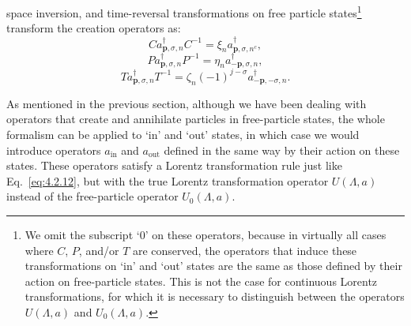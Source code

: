 space inversion, and time-reversal transformations on free particle states\footnote{We
omit the subscript `0' on these operators, because in virtually all cases where $C$,
$P$, and/or $T$ are conserved, the operators that induce these transformations on
`in' and `out' states are the same as those defined by their action on free-particle
states. This is not the case for continuous Lorentz transformations, for which it is
necessary to distinguish between the operators $U(\Lambda,a)$ and $U_0(\Lambda,a)$.}
transform the creation operators as:
\begin{equation}
  Ca^\dagger_{\mathbf p,\sigma,n}C^{-1}
  =\xi_n a^\dagger_{\mathbf p,\sigma,n^c},
  \tag{4.2.13}
  \label{eq:4.2.13}
\end{equation}
\begin{equation}
  Pa^\dagger_{\mathbf p,\sigma,n}P^{-1}
  =\eta_n a^\dagger_{-\mathbf p,\sigma,n},
  \tag{4.2.14}
  \label{eq:4.2.14}
\end{equation}
\begin{equation}
  Ta^\dagger_{\mathbf p,\sigma,n}T^{-1}
  =\zeta_n(-1)^{j-\sigma}a^\dagger_{-\mathbf p,-\sigma,n}.
  \tag{4.2.15}
  \label{eq:4.2.15}
\end{equation}

As mentioned in the previous section, although we have been dealing
with operators that create and annihilate particles in free-particle states,
the whole formalism can be applied to `in' and `out' states, in which case
we would introduce operators $a_{\mathrm{in}}$ and $a_{\mathrm{out}}$ defined in the same way by
their action on these states. These operators satisfy a Lorentz transformation
rule just like Eq.~\eqref{eq:4.2.12}, but with the true Lorentz transformation
operator $U(\Lambda,a)$ instead of the free-particle operator $U_0(\Lambda,a)$.
